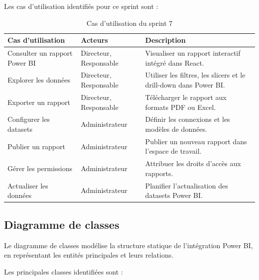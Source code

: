 Les cas d'utilisation identifiés pour ce sprint sont :

\begin{table}[H]
\centering
\begin{tabular}{|p{4cm}|p{3.5cm}|p{6cm}|}
\hline
\textbf{Cas d'utilisation} & \textbf{Acteurs} & \textbf{Description} \\
\hline
Consulter un rapport Power BI & Directeur, Responsable & Visualiser un rapport interactif intégré dans React. \\
\hline
Explorer les données & Directeur, Responsable & Utiliser les filtres, les slicers et le drill-down dans Power BI. \\
\hline
Exporter un rapport & Directeur, Responsable & Télécharger le rapport aux formats PDF ou Excel. \\
\hline
Configurer les datasets & Administrateur & Définir les connexions et les modèles de données. \\
\hline
Publier un rapport & Administrateur & Publier un nouveau rapport dans l'espace de travail. \\
\hline
Gérer les permissions & Administrateur & Attribuer les droits d'accès aux rapports. \\
\hline
Actualiser les données & Administrateur & Planifier l'actualisation des datasets Power BI. \\
\hline
\end{tabular}
\caption{Cas d'utilisation du sprint 7}
\label{tab:use-cases-powerbi}
\end{table}

\subsection{Diagramme de classes}
\label{subsec:sprint7-classes}

Le diagramme de classes modélise la structure statique de l'intégration Power BI, en représentant les entités principales et leurs relations.

Les principales classes identifiées sont :

